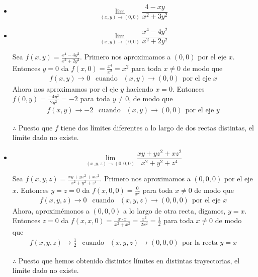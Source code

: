 \documentclass[12pt]{article}
\begin{document}
\begin{itemize}[format=\textbf]

\item $$\lim_{(x,y) \to (0,0)} \frac{4-xy}{x^2+3y^2}$$

\item $$\lim_{(x,y) \to (0,0)} \frac{x^4-4y^2}{x^2+2y^2}$$

  Sea $f(x,y) = \frac{x^4-4y^2}{x^2+2y^2}$. Primero nos aproximamos a $(0,0)$ por el eje $x$. Entonces $y=0$ da $f(x,0)=\frac{x^4}{x^2}=x^2$ para toda $x \neq 0$ de modo que 
  \begin{align*}
    f(x,y) \rightarrow 0 ~~ \text{ cuando }~~ (x,y) \rightarrow (0,0) ~~ \text{por el eje }x
  \end{align*}
  Ahora nos aproximamos por el eje $y$ haciendo $x=0$. Entonces $f(0,y) =  \frac{-4y^2}{2y^2}=-2$ para toda $y \neq 0$, de modo que
  \begin{align*}
    f(x,y) \rightarrow -2 ~~ \text{ cuando }~~ (x,y) \rightarrow (0,0) ~~ \text{por el eje }y
  \end{align*}

  $\therefore$ Puesto que $f$ tiene dos límites diferentes a lo largo de dos rectas distintas, el límite dado no existe.

\item $$\lim_{(x,y,z) \to (0,0,0)} \frac{xy+yz^2+xz^2}{x^2+y^2+z^4}$$

  Sea $f(x,y,z) =  \frac{xy+yz^2+xz^2}{x^2+y^2+z^4}$. Primero nos aproximamos a $(0,0,0)$ por el eje $x$. Entonces $y=z=0$ da $f(x,0,0)= \frac{0}{x^2}$ para toda $x \neq 0$ de modo que 
  \begin{align*}
    f(x,y,z) \rightarrow 0 ~~ \text{ cuando }~~ (x,y,z) \rightarrow (0,0,0) ~~ \text{por el eje }x
  \end{align*}
  Ahora, aproximémonos a $(0, 0,0)$ a lo largo de otra recta, digamos, $y=x$. Entonces $z=0$ da $f(x,x,0)= \frac{x\cdot x}{x^2+x^2}= \frac{x^2}{2x^2}=\frac{1}{2}$ para toda $x\neq 0$ de modo que 
  \begin{align*}
    f(x,y,z) \rightarrow \frac{1}{2} ~~ \text{ cuando }~~ (x,y,z) \rightarrow (0,0,0) ~~ \text{por la recta }y=x
  \end{align*}

$\therefore$ Puesto que hemos obtenido distintos límites en distintas trayectorias,
el límite dado no existe.

\end{itemize}
\end{document}
